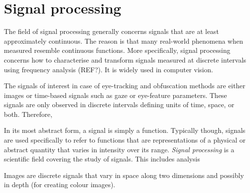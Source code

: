 




\section{Signal processing}
The field of signal processing generally concerns signals that are at least approximately continuous. The reason is that many real-world phenomena when measured resemble continuous functions. More specifically, signal processing concerns how to characterise and transform signals measured at discrete intervals using frequency analysis (REF?). It is widely used in computer vision.

The signals of interest in case of eye-tracking and obfuscation methods are either images or time-based signals such as gaze or eye-feature parameters. These signals are only observed in discrete intervals defining units of time, space, or both. Therefore, 


In its most abstract form, a signal is simply a function. Typically though, signals are used specifically to refer to functions that are representations of a physical or abstract quantity that varies in intensity over its range. \emph{Signal processing} is a scientific field covering the study of signals. This includes analysis 

Images are discrete signals that vary in space along two dimensions and possibly in depth (for creating colour images). 


